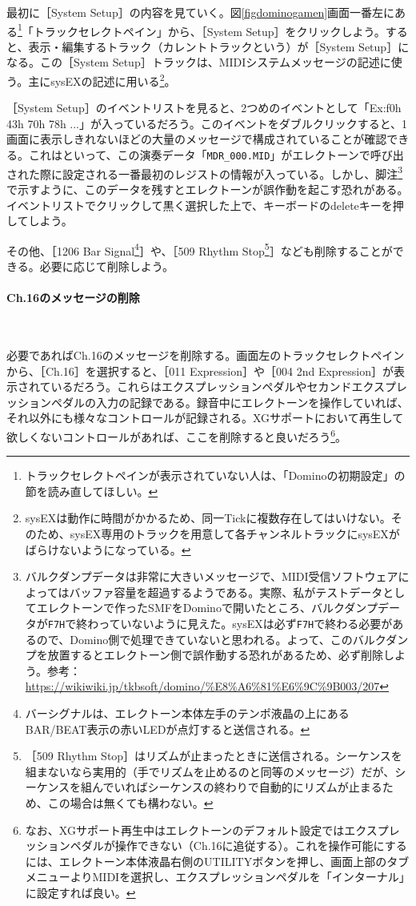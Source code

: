 \documentclass[uplatex, 10pt, dvipdfmx]{jsarticle}
\numberwithin{equation}{section}
\newcommand{\emphj}[1]{\textbf{\textrm{\textgt{{#1}}}}}
\begin{document}
最初に［System Setup］の内容を見ていく。図\ref{figdominogamen}画面一番左にある\footnote{トラックセレクトペインが表示されていない人は、「Dominoの初期設定」の節を読み直してほしい。}「トラックセレクトペイン」から、［System Setup］をクリックしよう。すると、表示・編集するトラック（カレントトラックという）が［System Setup］になる。この［System Setup］トラックは、MIDIシステムメッセージの記述に使う。主にsysEXの記述に用いる\footnote{sysEXは動作に時間がかかるため、同一Tickに複数存在してはいけない。そのため、sysEX専用のトラックを用意して各チャンネルトラックにsysEXがばらけないようになっている。}。

［System Setup］のイベントリストを見ると、2つめのイベントとして「Ex:f0h 43h 70h 78h ...」が入っているだろう。このイベントをダブルクリックすると、1画面に表示しきれないほどの大量のメッセージで構成されていることが確認できる。これは\emphj{バルクダンプ}といって、この演奏データ「\texttt{MDR_000.MID}」がエレクトーンで呼び出された際に設定される一番最初のレジストの情報が入っている。しかし、脚注\footnote{バルクダンプデータは非常に大きいメッセージで、MIDI受信ソフトウェアによってはバッファ容量を超過するようである。実際、私がテストデータとしてエレクトーンで作ったSMFをDominoで開いたところ、バルクダンプデータが\texttt{F7H}で終わっていないように見えた。sysEXは必ず\texttt{F7H}で終わる必要があるので、Domino側で処理できていないと思われる。よって、このバルクダンプを放置するとエレクトーン側で誤作動する恐れがあるため、必ず削除しよう。参考：\url{https://wikiwiki.jp/tkbsoft/domino/%E8%A6%81%E6%9C%9B003/207}}で示すように、このデータを残すとエレクトーンが誤作動を起こす恐れがある。イベントリストでクリックして黒く選択した上で、キーボードのdeleteキーを押して\emphj{必ず削除}しよう。

その他、［1206 Bar Signal\footnote{バーシグナルは、エレクトーン本体左手のテンポ液晶の上にあるBAR/BEAT表示の赤いLEDが点灯すると送信される。}］や、［509 Rhythm Stop\footnote{［509 Rhythm Stop］はリズムが止まったときに送信される。シーケンスを組まないなら実用的（手でリズムを止めるのと同等のメッセージ）だが、シーケンスを組んでいればシーケンスの終わりで自動的にリズムが止まるため、この場合は無くても構わない。}］なども削除することができる。必要に応じて削除しよう。

\paragraph{Ch.16のメッセージの削除} \ 

必要であればCh.16のメッセージを削除する。画面左のトラックセレクトペインから、［Ch.16］を選択すると、［011 Expression］や［004 2nd Expression］が表示されているだろう。これらはエクスプレッションペダルやセカンドエクスプレッションペダルの入力の記録である。録音中にエレクトーンを操作していれば、それ以外にも様々なコントロールが記録される。XGサポートにおいて再生して欲しくないコントロールがあれば、ここを削除すると良いだろう\footnote{なお、XGサポート再生中はエレクトーンのデフォルト設定ではエクスプレッションペダルが操作できない（Ch.16に追従する）。これを操作可能にするには、エレクトーン本体液晶右側のUTILITYボタンを押し、画面上部のタブメニューよりMIDIを選択し、エクスプレッションペダルを「インターナル」に設定すれば良い。}。
\end{document}
